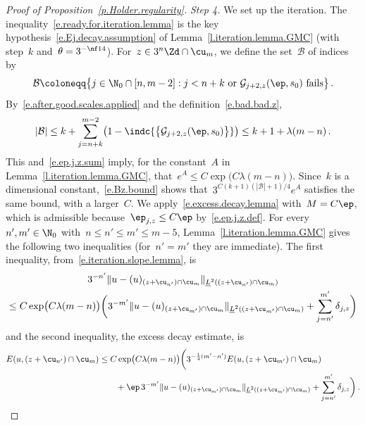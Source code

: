 \documentclass[11pt]{amsart}
\begin{document}
\begin{proof}[{Proof of Proposition~\ref{p.Holder.regularity}}]
\smallskip

\emph{Step 4.} We set up the iteration. The inequality~\eqref{e.ready.for.iteration.lemma} is the key hypothesis~\eqref{e.Ej.decay.assumption} of Lemma~\ref{l.iteration.lemma.GMC} (with step~$k$ and~$\theta=3^{-\nf14}$). For~$z\in 3^n\Zd\cap\cu_m$, we define the set~$\mathcal B$ of indices by
\begin{equation}
	\mathcal{B} \coloneqq
	\bigl\{j\in\N_0\cap[n,m-2] : j<n+k
	\ \text{or}\ \mathcal{G}_{j+2,z}(\ep,s_0) \text{ fails}\bigr\}\,.
	\label{e.bad.bad.z}
\end{equation}
By~\eqref{e.after.good.scales.applied} and the definition~\eqref{e.bad.bad.z},
\begin{equation}
	|\mathcal B|
	\leq k+\sum_{j=n+k}^{m-2}\bigl(1-\indc{\bigl\{\mathcal{G}_{j+2,z}(\ep,s_0)\bigr\}}\bigr)
	\leq k+1+\lambda(m-n)\,.
	\label{e.Bz.bound}
\end{equation}
This and~\eqref{e.ep.j.z.sum} imply, for the constant~$A$ in Lemma~\ref{l.iteration.lemma.GMC}, that~$e^A\leq C\exp\bigl(C\lambda(m-n)\bigr)$. Since~$k$ is a dimensional constant,~\eqref{e.Bz.bound} shows that~$3^{C(k+1)(|\mathcal B|+1)/4}e^A$ satisfies the same bound, with a larger~$C$. We apply~\eqref{e.excess.decay.lemma} with~$M=C\ep$, which is admissible because~$\ep_{j,z}\leq C\ep$ by~\eqref{e.ep.j.z.def}. For every~$n',m'\in\N_0$ with~$n\leq n'\leq m'\leq m-5$, Lemma~\ref{l.iteration.lemma.GMC} gives the following two inequalities (for~$n'=m'$ they are immediate). The first inequality, from~\eqref{e.iteration.slope.lemma}, is
\begin{multline}
	3^{-n'}\|u-(u)_{(z+\cu_{n'})\cap\cu_m}\|_{\underline{L}^2((z+\cu_{n'})\cap\cu_m)}
	\\
	\leq C\exp\bigl(C\lambda(m-n)\bigr)
	\biggl(3^{-m'}\|u-(u)_{(z+\cu_{m'})\cap\cu_m}\|_{\underline{L}^2((z+\cu_{m'})\cap\cu_m)}
	+ \sum_{j=n'}^{m'}\delta_{j,z}\biggr)
	\label{e.iteration.slope.applied}
\end{multline}
and the second inequality, the excess decay estimate, is
\begin{align}
	E(u,(z+\cu_{n'})\cap\cu_m)
	&
	\leq C\exp\bigl(C\lambda(m-n)\bigr)
	\biggl(3^{-\frac{1}{4}(m'-n')} E(u,(z+\cu_{m'})\cap\cu_m)
	\notag \\ & \qquad
	+ \ep\, 3^{-m'}\|u-(u)_{(z+\cu_{m'})\cap\cu_m}\|_{\underline{L}^2((z+\cu_{m'})\cap\cu_m)}
	+ \sum_{j=n'}^{m'}\delta_{j,z}\biggr)\,.
	\label{e.excess.decay.applied}
\end{align}

\smallskip


\end{proof}
\end{document}
